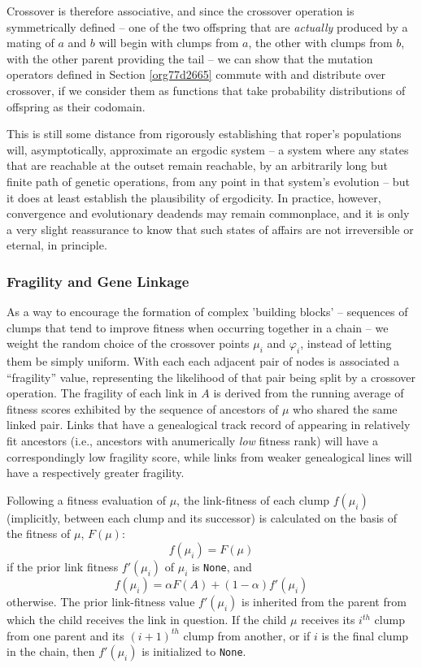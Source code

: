 \documentclass[12pt,glossary]{dalthesis}
\begin{document}
Crossover is therefore associative, and since the crossover operation is symmetrically
defined -- one of the two offspring that are \emph{actually} produced by a mating of \(a\) 
and \(b\) will begin with clumps from \(a\), the other with clumps from \(b\), with the other
parent providing the tail -- we can show that the mutation operators defined in
Section \ref{org77d2665} commute with and distribute over crossover, if we consider
them as functions that take probability distributions of offspring as their codomain. 

This is still some distance from rigorously establishing that \gls{roper}'s populations
will, asymptotically, approximate an ergodic system -- a system where any states that
are reachable at the outset remain reachable, by an arbitrarily long but
finite path of genetic operations, from any point in that system's evolution -- but
it does at least establish the plausibility of ergodicity. In practice, however,
convergence and evolutionary deadends may remain commonplace, and it is only a very
slight reassurance to know that such states of affairs are not irreversible or 
eternal, in principle. 


\subsubsection{Fragility and Gene Linkage}
\label{sec:orgf43bafc}
\label{org16d29d6}

As a way to encourage the formation of complex 'building blocks' -- sequences of
clumps that tend to improve fitness when occurring together in a chain -- we
weight the random choice of the crossover points \(\mu_i\) and \(\varphi_i\),
instead of letting them be simply uniform. With each each adjacent pair of nodes
is associated a ``fragility'' value, representing the likelihood of that
pair being split by a crossover operation. The fragility of each link in \(A\) is
derived from the running average of fitness scores exhibited by the sequence of
ancestors of \(\mu\) who shared the same linked pair. Links that have a genealogical
track record of appearing in relatively fit ancestors (i.e., ancestors with anumerically 
\emph{low} fitness rank) will have a correspondingly low fragility score, while links
from weaker genealogical lines will have a respectively greater fragility.

Following a fitness evaluation of \(\mu\), the link-fitness of each clump \(f(\mu_i)\)
(implicitly, between each clump and its successor) is calculated on the basis of
the fitness of \(\mu\), \(F(\mu)\): $$ f(\mu_i) = F(\mu)$$ if the prior link fitness
\(f'(\mu_i)\) of \(\mu_i\) is \texttt{None}, and $$ f(\mu_i) = \alpha F(A) + (1-\alpha)
 f'(\mu_i) $$ otherwise. The prior link-fitness value \(f'(\mu_i)\) is inherited from
the parent from which the child receives the link in question. If the
child \(\mu\) receives its \(i^{th}\) clump from one parent and its \((i+1)^{th}\) clump
from another, or if \(i\) is the final clump in the chain, then \(f'(\mu_i)\) is
initialized to \texttt{None}.
\end{document}
